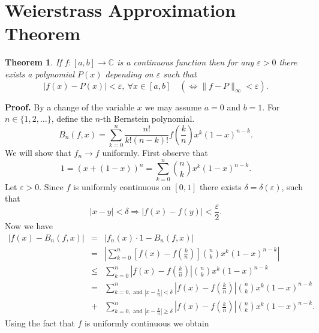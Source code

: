 \documentclass[12pt]{report}
\newtheorem{theorem}{Theorem}[section]
\begin{document}
\section{Weierstrass Approximation Theorem}
\begin{theorem}\label{th:W-Approx.}  If $f: [a, b] \to \mathbb{C}$ is a
continuous function then
for any  $\varepsilon > 0$ there exists  a polynomial
$P(x)$ depending  on $\varepsilon$ such that 
\[
|f(x) - P(x)| <
\varepsilon, \ \forall x \in [a, b]\quad (\Longleftrightarrow
\|f-P\|_\infty <
\varepsilon).
\]
\end{theorem}
{\bf Proof.}  By a change of the variable $x$ we may assume 
$a=0$ and $ b=1$. For $n \in \{1, 2, \dots\}$, define the $n$-th
Bernstein polynomial.  
\[
B_n(f, x) = \sum^n_{k=0} \frac{n!}{k!(n-k)!}  
f\left ( \frac{k}{n} \right ) x^k (1-x)^{n-k}.
\]
We will show that $f_n\to f$ uniformly. First observe that
\[
\displaystyle{1=(x+(1-x))^n = \sum^n_{k=0}
\binom nk x^k (1-x)^{n-k}.}
\]
Let $\varepsilon > 0 $.  Since $f$ is uniformly continuous on
 $[0,1]$ there exists $\delta = \delta (\varepsilon)$, such that
\[
|x-y| < \delta
\Longrightarrow |f(x) - f(y)| < \frac{\varepsilon}{2}.
\]
 Now we have
\begin{eqnarray*}
|f(x) - B_n(f, x)| &=&  |f_n(x)\cdot 1 - B_n(f, x)|\\
&=& \left | \sum^n_{k=0}\left  [f(x) - f\left ( \frac{k}{n}\right
)\right ]
\binom nk x^k (1-x)^{n-k}\right |\\
&\le & \sum^n_{k=0} \left |f(x) - f\left ( \frac{k}{n} \right ) \right |
\binom nk x^k(1-x)^{n-k}\\
&=& \sum^n_{k=0,\text{ and } |x - \frac{k}{n}| < \delta} \left |
f(x) - f
\left (
\frac{k}{n}\right )\right |
\binom nk x^k (1-x)^{n-k} \\
&+&\sum^n_{k=0, \text{ and } |x-\frac{k}{n}| \ge
\delta}\left |f(x) - f\left (
\frac{k}{n}\right ) \right | \binom nk x^k (1-x)^{n-k}.
\end{eqnarray*}
Using the fact that  $f$ is  uniformly continuous we obtain
\end{document}
